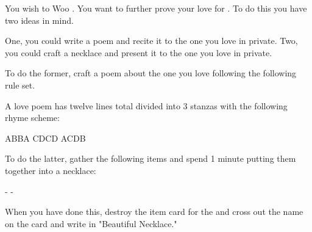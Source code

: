 \documentclass[green]{guildcamp4}
\begin{document}
\name{\gWoo{}}

You wish to Woo \cJulie{}. You want to further prove your love for . To do this you have two ideas in mind.

One, you could write a poem and recite it to the one you love in private.
Two, you could craft a necklace and present it to the one you love in private.

To do the former, craft a poem about the one you love following the following rule set.

A love poem has twelve lines total divided into 3 stanzas with the following rhyme scheme:

ABBA CDCD ACDB

To do the latter, gather the following items and spend 1 minute putting them together into a necklace:

- \iWires{}
- \iGlassLens{} 

When you have done this, destroy the item card for the \iGlassLens{} and cross out the name on the \iWires{} card and write in "Beautiful Necklace."
\end{document}
